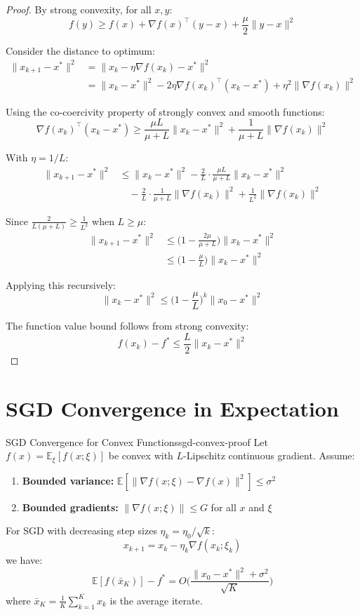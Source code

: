 \documentclass[../main.tex]{subfiles}
\begin{document}
\begin{proof}
By strong convexity, for all $x, y$:
\[
f(y) \geq f(x) + \nabla f(x)^\top(y-x) + \frac{\mu}{2}\|y-x\|^2
\]

Consider the distance to optimum:
\begin{align}
\|x_{k+1} - x^*\|^2 &= \|x_k - \eta\nabla f(x_k) - x^*\|^2 \\
&= \|x_k - x^*\|^2 - 2\eta\nabla f(x_k)^\top(x_k - x^*) + \eta^2\|\nabla f(x_k)\|^2
\end{align}

Using the co-coercivity property of strongly convex and smooth functions:
\[
\nabla f(x_k)^\top(x_k - x^*) \geq \frac{\mu L}{\mu + L}\|x_k - x^*\|^2 + \frac{1}{\mu + L}\|\nabla f(x_k)\|^2
\]

With $\eta = 1/L$:
\begin{align}
\|x_{k+1} - x^*\|^2 &\leq \|x_k - x^*\|^2 - \frac{2}{L} \cdot \frac{\mu L}{\mu + L}\|x_k - x^*\|^2 \\
&\quad - \frac{2}{L} \cdot \frac{1}{\mu + L}\|\nabla f(x_k)\|^2 + \frac{1}{L^2}\|\nabla f(x_k)\|^2
\end{align}

Since $\frac{2}{L(\mu+L)} \geq \frac{1}{L^2}$ when $L \geq \mu$:
\begin{align}
\|x_{k+1} - x^*\|^2 &\leq \Big(1 - \frac{2\mu}{\mu + L}\Big)\|x_k - x^*\|^2 \\
&\leq \Big(1 - \frac{\mu}{L}\Big)\|x_k - x^*\|^2
\end{align}

Applying this recursively:
\[
\|x_k - x^*\|^2 \leq \Big(1 - \frac{\mu}{L}\Big)^k \|x_0 - x^*\|^2
\]

The function value bound follows from strong convexity:
\[
f(x_k) - f^* \leq \frac{L}{2}\|x_k - x^*\|^2
\]
\end{proof}

\section{SGD Convergence in Expectation}\label{sec:proof-sgd-convergence}

\begin{theorem}{SGD Convergence for Convex Functions}{sgd-convex-proof}
Let $f(x) = \mathbb{E}_\xi[f(x; \xi)]$ be convex with $L$-Lipschitz continuous gradient. Assume:
\begin{enumerate}
    \item \textbf{Bounded variance:} $\mathbb{E}[\|\nabla f(x; \xi) - \nabla f(x)\|^2] \leq \sigma^2$
    \item \textbf{Bounded gradients:} $\|\nabla f(x; \xi)\| \leq G$ for all $x$ and $\xi$
\end{enumerate}
For SGD with decreasing step sizes $\eta_k = \eta_0 / \sqrt{k}$:
\[
x_{k+1} = x_k - \eta_k \nabla f(x_k; \xi_k)
\]
we have:
\[
\mathbb{E}[f(\bar{x}_K)] - f^* = O\Big(\frac{\|x_0 - x^*\|^2 + \sigma^2}{\sqrt{K}}\Big)
\]
where $\bar{x}_K = \frac{1}{K}\sum_{k=1}^K x_k$ is the average iterate.
\end{theorem}
\end{document}
